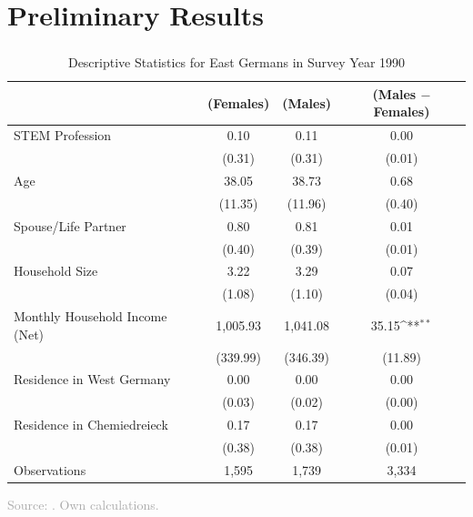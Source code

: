 \documentclass[11pt, aspectratio=1610, xcolor={dvipsnames}]{beamer}
\def\sym#1{\ifmmode^{#1}\else\(^{#1}\)\fi}
\begin{document}
	\section{Preliminary Results}
	\begin{frame}
		\frametitle{}
		{\linespread{1}\tiny
			\begin{table}[h]
				\centering
				\caption{Descriptive Statistics for East Germans in Survey Year 1990}
				\label{tab:descriptives}
				\begin{tabular}{l*{3}{c}}
					\toprule
					& (Females) & (Males) & (Males $-$ Females) \\
					\midrule
					STEM Profession     &        0.10&             0.11&          0.00      \\
					&     (0.31)&           (0.31)&           (0.01)\\
					\addlinespace
					Age                 &      38.05&          38.73&        0.68 \\
					&     (11.35)&        (11.96)         &      (0.40)\\
					\addlinespace
					Spouse/Life Partner &        0.80&            0.81&        0.01       \\
					&      (0.40)&          (0.39)&         (0.01)\\
					\addlinespace
					Household Size      &        3.22&         3.29&           0.07        \\
					&          (1.08)&       (1.10)        &      (0.04)\\
					\addlinespace
					Monthly Household Income (Net)&     1,005.93&       1,041.08&      35.15\sym{**} \\
					&    (339.99)&      (346.39)&         (11.89)\\
					\addlinespace
					Residence in West Germany&        0.00&        0.00&         0.00         \\
					&         (0.03)&       (0.02)&          (0.00)\\
					\addlinespace
					Residence in Chemiedreieck&        0.17&        0.17&         0.00     \\
					&          (0.38)&       (0.38)&            (0.01)\\
					\midrule
					Observations        &        1,595&             1,739&            3,334               \\
					\bottomrule
				\end{tabular}
			\end{table}
		}
		
		{\scriptsize
			\textcolor{darkgray}{Source: \cite{SOEP2023}. Own calculations.}
		}
		
	\end{frame}
		
\end{document}
